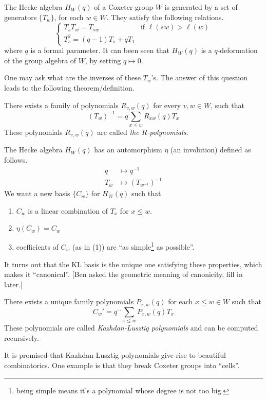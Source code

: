 The Hecke algebra $H_W(q)$ of a Coxeter group $W$ is generated by a set of generators $\{T_w\}$, for each $w\in W$. They satisfy the following relations.
\[\begin{cases}
T_sT_w =T_{sw}&\text{if }\ell(sw)>\ell(w)\\
T_s^2 = (q-1)T_s+qT_1	
\end{cases}
\]
where $q$ is a formal parameter. It can been seen that $H_W(q)$ is a $q$-deformation of the group algebra of $W$, by setting $q\mapsto 0$.

One may ask what are the inverses of these $T_w$'s. The answer of this question leads to the following theorem/definition.
\begin{theorem}[KL?]There exists a family of polynomials $R_{v,w}(q)$ for every $v,w\in W$, such that
\[(T_w)^{-1}=q\sum_{x\leq w}R_{xw}(q) T_x\]	
These polynomials $R_{v,w}(q)$ are called \emph{the $R$-polynomials}.
\end{theorem}
The Hecke algebra $H_W(q)$ has an automorphism $\eta$ (an involution) defined as follows.
\begin{align*}
q&\mapsto q^{-1}\\	
T_w&\mapsto (T_{w^{-1}})^{-1}
\end{align*}
We want a new basis $\{C_w\}$ for $H_W(q)$ such that 
\begin{enumerate}
	\item $C_w$ is a linear combination of $T_x$ for $x\leq w$.
	\item $\eta(C_w)=C_w$
	\item coefficients of $C_w$ (as in (1)) are ``as simple\footnote{being simple means it's a polynomial whose degree is not too big.} as possible''.
\end{enumerate}

It turns out that the KL basis is the unique one satisfying these properties, which makes it ``canonical''. [Ben asked the geometric meaning of 
canonicity, fill in later.]
\begin{theorem}[KL]
	There exists a unique family polynomials $P_{x,w}(q)$ for each $x\leq w\in W$ such that
	\[C_w'=q^{\cdots} \sum_{x\leq w}P_{x,w}(q)T_x\]
	These polynomials are called \emph{Kazhdan-Lusztig polynomials} and can be computed recursively.
\end{theorem}

It is promised that Kazhdan-Lusztig polynomials give rise to beautiful combinatorics. One example is that they break Coxeter groups into ``cells''.

